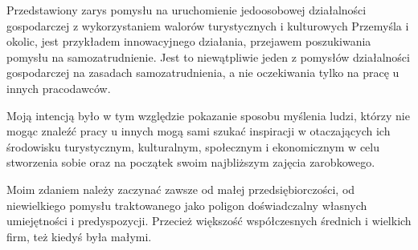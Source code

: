 \documentclass{sprawozdanie-agh}
\begin{document}
		Przedstawiony zarys pomysłu na uruchomienie jedoosobowej działalności gospodarczej z wykorzystaniem walorów turystycznych i kulturowych Przemyśla i okolic, jest przykładem innowacyjnego działania, przejawem poszukiwania pomysłu na samozatrudnienie. Jest to niewątpliwie jeden z pomysłów działalności gospodarczej na zasadach samozatrudnienia, a nie oczekiwania tylko na pracę u innych pracodawców.
		
		Moją intencją było w tym względzie pokazanie sposobu myślenia ludzi, którzy nie mogąc  znaleźć pracy u innych mogą sami szukać inspiracji w otaczających ich środowisku turystycznym, kulturalnym, społecznym i ekonomicznym w celu stworzenia sobie oraz na początek swoim najbliższym zajęcia zarobkowego.
		
		Moim zdaniem należy zaczynać zawsze od małej przedsiębiorczości, od niewielkiego pomysłu traktowanego jako poligon doświadczalny własnych umiejętności i predyspozycji. Przecież większość współczesnych średnich i wielkich firm, też kiedyś była małymi.
\end{document}
